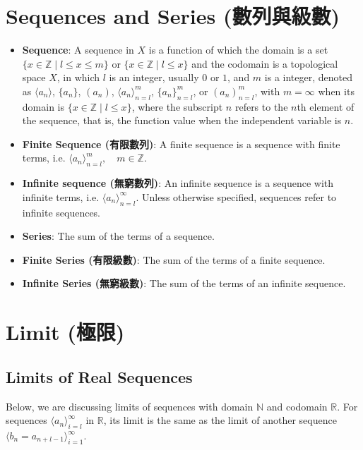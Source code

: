 \documentclass[a4paper,12pt]{report}
\begin{document}
\section{Sequences and Series (數列與級數)}
\begin{itemize}
\item\textbf{Sequence}: A sequence in $X$ is a function of which the domain is a set $\{x\in\mathbb{Z}\mid l\leq x\leq m\}$ or $\{x\in\mathbb{Z}\mid l\leq x\}$ and the codomain is a topological space $X$, in which $l$ is an integer, usually $0$ or $1$, and $m$ is a integer, denoted as $\langle a_n\rangle$, $\{a_n\}$, $(a_n)$, $\langle a_n\rangle_{n=l}^m$, $\{a_n\}_{n=l}^m$, or $(a_n)_{n=l}^m$, with $m=\infty$ when its domain is $\{x\in\mathbb{Z}\mid l\leq x\}$, where the subscript $n$ refers to the $n$th element of the sequence, that is, the function value when the  independent variable is $n$.
\item\textbf{Finite Sequence (有限數列)}: A finite sequence is a sequence with finite terms, i.e. $\langle a_n\rangle_{n=l}^m,\quad m\in\mathbb{Z}$.
\item\textbf{Infinite sequence (無窮數列)}: An infinite sequence is a sequence with infinite terms, i.e. $\langle a_n\rangle_{n=l}^\infty$. Unless otherwise specified, sequences refer to infinite sequences.
\end{itemize}
\begin{itemize}
\item\textbf{Series}: The sum of the terms of a sequence.
\item\textbf{Finite Series (有限級數)}: The sum of the terms of a finite sequence.
\item\textbf{Infinite Series (無窮級數)}: The sum of the terms of an infinite sequence.
\end{itemize}



\section{Limit (極限)}
\subsection{Limits of Real Sequences}
Below, we are discussing limits of sequences with domain $\mathbb{N}$ and codomain $\mathbb{R}$. For sequences $\langle a_n\rangle_{i=l}^\infty$ in $\mathbb{R}$, its limit is the same as the limit of another sequence $\langle b_n=a_{n+l-1}\rangle_{i=1}^\infty$.
\end{document}
